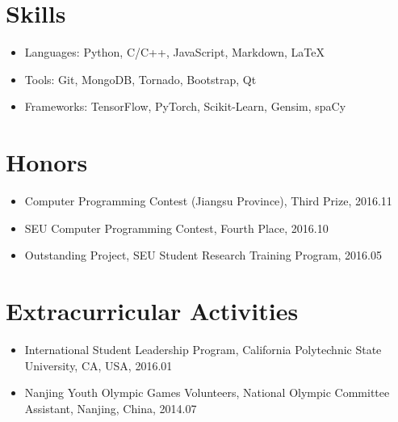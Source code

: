 \documentclass[letterpaper, 11pt]{article}
\newcommand{\resumeSingleSubItem}[1]{
   \item\small{#1} \vspace{-3pt}
}
\begin{document}
\section{Skills}
    \begin{itemize}[leftmargin=*, itemsep=0pt]
        \resumeSingleSubItem{Languages: Python, C/C++, JavaScript, Markdown, \LaTeX}
        \resumeSingleSubItem{Tools: Git, MongoDB, Tornado, Bootstrap, Qt}
        \resumeSingleSubItem{Frameworks: TensorFlow, PyTorch, Scikit-Learn, Gensim, spaCy}
    \end{itemize}\vspace{-10pt}

\section{Honors}
    \begin{itemize}[leftmargin=*, itemsep=0pt]
        \resumeSingleSubItem{Computer Programming Contest (Jiangsu Province), Third Prize, 2016.11}
        \resumeSingleSubItem{SEU Computer Programming Contest, Fourth Place, 2016.10}
        \resumeSingleSubItem{Outstanding Project, SEU Student Research Training Program, 2016.05}
    \end{itemize}\vspace{-10pt}

\section{Extracurricular Activities}
    \begin{itemize}[leftmargin=*, itemsep=0pt]
        \resumeSingleSubItem{International Student Leadership Program, California Polytechnic State University, CA, USA, 2016.01}
        \resumeSingleSubItem{Nanjing Youth Olympic Games Volunteers, National Olympic Committee Assistant, Nanjing, China, 2014.07}
    \end{itemize}\vspace{-10pt}


\end{document}
